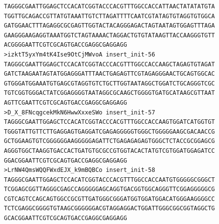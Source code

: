 \documentclass[11pt]{article}
\begin{document}
\begin{verbatim}
TAGGGCGAATTGGAGCTCCACATCGGTACCCACGTTTGGCCACCATTAACTATATATGTA
TGGTTGCAGACCGTTATGTAAATTGTCTTAGATTTTCAATCGTATAGTGTAGGTGTGGCA
GATGGAACTTTAGAGGCGCGAGTTGGTACTACAGGGAGACTAGTAATAGTGGAGTTTAGA
GAAGGGAAGAGGTAAATGGTCTAGTAAAACTAGGACTGTGTATAAGTTACCAAGGGTGTT
ACGGGGAATTCGTCGCAGTGACCGAGGCGAGGAGG
>izktT5yxYm4tK4Ise9OtCjMWvoA insert_init-56
TAGGGCGAATTGGAGCTCCACATCGGTACCCACGTTTGGCCACCAAGCTAGAGTGTAGAT
GATCTAAGAATAGTATGGAGGGATTTAACTGAGAGTTCGTAGAGGGAACTGCAGTGGCAC
GTGGGATGGAAATGTGAGCGTAGGTGTCTGCTTGGTAATAGGCTGGATCTGCAGGGTCGC
TGTCGGTGGGACTATCGGAGGGGTAATAGGCGCAAGCTGGGGTGATGCATAAGCGTTAAT
AGTTCGAATTCGTCGCAGTGACCGAGGCGAGGAGG
>D_X_8FNcqgcekMkN6HwwXxxeSWo insert_init-57
TAGGGCGAATTGGAGCTCCACATCGGTACCCACGTTTGGCCACCAAGTGGATCATGGTGT
TGGGTATTGTTCTTGAGGAGTGAGGATCGAGAGGGGGTGGGCTGGGGGAAGCGACAACCG
GCTGGAAGTGTCGGGGGGAAGGGGGAGATTCTGAGAGAGAGTGGGCTCTACCGCGGAGCG
AGGGTGGCTAAGGTGACCACTGATGTGCGCCGTGGTACACTATGTCGTGGATGGAGATCC
GGACGGAATTCGTCGCAGTGACCGAGGCGAGGAGG
>LrNW4QmsWQQFWxdEJX_k9mBQBCo insert_init-58
TAGGGCGAATTGGAGCTCCACATCGGTACCCACGTTTGGCCACCAATGTGGGGGCGGGCT
TCGGAGCGGTTAGGGCGAGCCAGGGGGAGCAGGTGACGGTGGCAGGGTTCGGAGGGGGCG
CGTCAGTCCAGCAGTGGCCGCGTTGATGGGCGGGATGGTGGATGGACATGGGAAGGGGCC
TCTCGAGGCGGGGTGTAAGCGGGGGGACGTAGGAGGACTGGATTGGGCGGCGGTAGGCTG
GCACGGAATTCGTCGCAGTGACCGAGGCGAGGAGG
\end{verbatim}


\pagebreak


\end{document}
